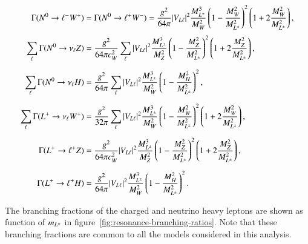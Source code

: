 %
\begin{align}
\label{eq:Gammatr0W}
\Gamma(\lzero \to \ell^- W^+) &=  \Gamma(\lzero \to \ell^+ W^-) =
\frac{g^2}{64 \pi} |V_{L\ell}|^2
\frac{M_{\lpm}^3}{M_W^2} \left( 1- \frac{M_W^2}{M_{\lpm}^2} \right)^2 
\left( 1 + 2 \frac{M_W^2}{M_{\lpm}^2} \right) , 
\\[0.1cm]
\label{eq:Gammatr0Z}
\sum_{\ell}\Gamma(\lzero \to \nu_{\ell} Z) &=  \frac{g^2}{64 \pi c_W^2} 
\sum_\ell |V_{L\ell}|^2
\frac{M_{\lpm}^3}{M_Z^2} \left( 1- \frac{M_Z^2}{M_{\lpm}^2} \right)^2 
\left( 1 + 2 \frac{M_Z^2}{M_{\lpm}^2}\right),
\\[0.2cm]
\label{eq:Gammatr0h}
\sum_{\ell}\Gamma(\lzero \to \nu_{\ell} H) &=  \frac{g^2}{64 \pi} 
\sum_\ell |V_{L\ell}|^2
\frac{M_{\lpm}^3}{M_W^2} \left( 1- \frac{M_H^2}{M_{\lpm}^2} \right)^2 ,
\\[0.2cm]
\label{eq:Gammatr+W}
\sum_{\ell}\Gamma(\lplus \to \nu_{\ell} W^+) &= 
\frac{g^2}{32 \pi} \sum_\ell |V_{L\ell}|^2
\frac{M_{\lpm}^3}{M_W^2} \left( 1- \frac{M_W^2}{M_{\lpm}^2} \right)^2 
\left( 1 + 2 \frac{M_W^2}{M_{\lpm}^2} \right) ,
\\[0.2cm]
\label{eq:Gammatr+Z}
\Gamma(\lplus \to \ell^+ Z) &= 
\frac{g^2}{64 \pi c_W^2} |V_{L\ell}|^2
\frac{M_{\lpm}^3}{M_Z^2} \left( 1- \frac{M_Z^2}{M_{\lpm}^2} \right)^2 
\left( 1 + 2 \frac{M_Z^2}{M_{\lpm}^2}\right),
\\[0.2cm]
\label{eq:Gammatr+h}
\Gamma(\lplus \to \ell^+ H) &= \frac{g^2}{64 \pi} |V_{L\ell}|^2
\frac{M_{\lpm}^3}{M_W^2} \left( 1- \frac{M_H^2}{M_{\lpm}^2} \right)^2 .
\end{align}

The branching fractions of the charged and neutrino heavy leptons are shown as function of $m_{L^{\pm}}$ in figure~\ref{fig:resonance-branching-ratios}. Note that these branching fractions are common to all the models considered in this analysis.



